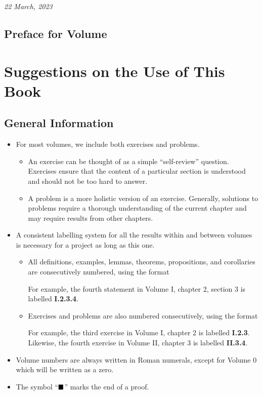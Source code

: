 \hfill{\textit{22 March, 2023}}

\section*{Preface for Volume \rom{\volumenumber}}
\prefacevolumetext

\hfill{\textit{\prefacevolumedate}}

\chapter{Suggestions on the Use of This Book}
\section*{General Information}
\begin{itemize}
    \item For most volumes, we include both exercises and problems.
    \begin{itemize}
        \item An exercise can be thought of as a simple ``self-review'' question. Exercises ensure that the content of a particular section is understood and should not be too hard to answer.
        \item A problem is a more holistic version of an exercise. Generally, solutions to problems require a thorough understanding of the current chapter and may require results from other chapters.
    \end{itemize}
    \item A consistent labelling system for all the results within and between volumes is necessary for a project as long as this one.
    \begin{itemize}
        \item All definitions, examples, lemmas, theorems, propositions, and corollaries are consecutively numbered, using the format
        \begin{quote}
        \end{quote}
        For example, the fourth statement in Volume I, chapter 2, section 3 is labelled \textbf{I.2.3.4}.
        \item Exercises and problems are also numbered consecutively, using the format
        \begin{quote}
        \end{quote}
        For example, the third exercise in Volume I, chapter 2 is labelled \textbf{I.2.3}. Likewise, the fourth exercise in Volume II, chapter 3 is labelled \textbf{II.3.4}.
    \end{itemize}
    \item Volume numbers are always written in Roman numerals, except for Volume 0 which will be written as a zero.
    \item The symbol ``$\blacksquare$'' marks the end of a proof.
\end{itemize}

